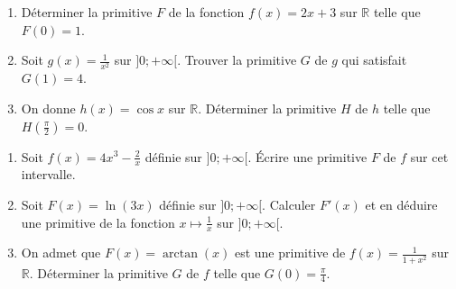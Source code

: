 \documentclass[11pt]{article}
\begin{document}
\begin{exercice}
\begin{enumerate}
    \item Déterminer la primitive $F$ de la fonction $f(x) = 2x + 3$ sur $\mathbb{R}$ telle que $F(0) = 1$.
    \item Soit $g(x) = \frac{1}{x^2}$ sur $]0; +\infty[$. Trouver la primitive $G$ de $g$ qui satisfait $G(1) = 4$.
    \item On donne $h(x) = \cos x$ sur $\mathbb{R}$. Déterminer la primitive $H$ de $h$ telle que $H(\frac{\pi}{2}) = 0$.
\end{enumerate}
\end{exercice}

\begin{exercice}
\begin{enumerate}
    \item Soit $f(x) = 4x^3 - \frac{2}{x}$ définie sur $]0; +\infty[$. Écrire une primitive $F$ de $f$ sur cet intervalle.
    \item Soit $F(x) = \ln(3x)$ définie sur $]0; +\infty[$. Calculer $F'(x)$ et en déduire une primitive de la fonction $x \mapsto \frac{1}{x}$ sur $]0; +\infty[$.
    \item On admet que $F(x) = \arctan(x)$ est une primitive de $f(x) = \frac{1}{1+x^2}$ sur $\mathbb{R}$. Déterminer la primitive $G$ de $f$ telle que $G(0) = \frac{\pi}{4}$.
\end{enumerate}
\end{exercice}
\end{document}
